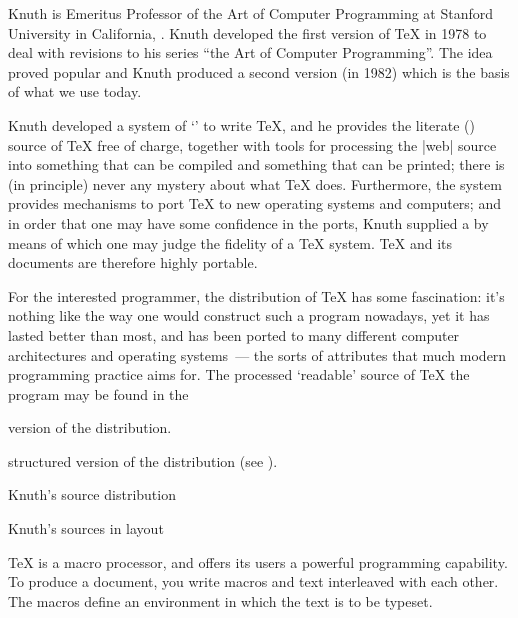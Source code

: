 Knuth is Emeritus Professor of the Art of Computer Programming at
Stanford University in California, .  Knuth developed the
first version of \TeX{} in 1978 to deal with revisions to his series
``the Art of Computer Programming''.  The idea proved popular and
Knuth produced a second version (in 1982) which is the basis of what
we use today.

Knuth developed a system of %
`' to write \TeX{},
and he provides the literate () source of \TeX{} free of charge,
together with tools for processing the |web| source into something
that can be compiled and something that can be printed; there is (in
principle) never any mystery about what \TeX{} does.  Furthermore, the
 system provides mechanisms to port \TeX{} to new operating
systems and computers; and in order that one may have some confidence
in the ports, Knuth supplied a  by
means of which one may judge the fidelity of a \TeX{} system.  \TeX{}
and its documents are therefore highly portable.

For the interested programmer, the distribution of \TeX{} has some
fascination: it's nothing like the way one would construct such a
program nowadays, yet it has lasted better than most, and has been
ported to many different computer architectures and operating
systems~--- the sorts of attributes that much modern programming
practice aims for.  The processed `readable' source of \TeX{} the
program may be found in the %
\begin{hyperversion}
   version of the distribution.
\end{hyperversion}
\begin{dviversion}
   structured version of the distribution (see
  ).
\end{dviversion}
\begin{ctanrefs}
\item[\nothtml{\rmfamily}Knuth's source distribution]
\item[\nothtml{\rmfamily}Knuth's sources in \acro{TDS} layout]
\end{ctanrefs}


\TeX{} is a macro processor, and offers its users a powerful
programming capability.  To produce a document, you write macros and
text interleaved with each other.  The macros define an environment in
which the text is to be typeset.

